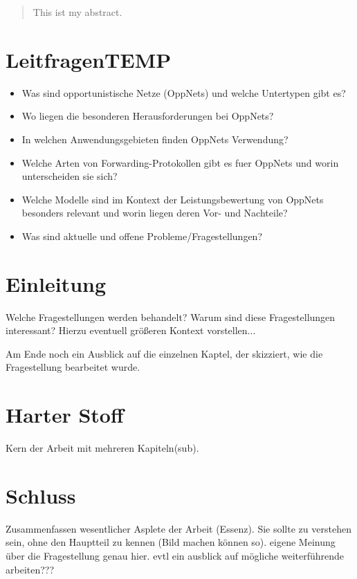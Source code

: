 \documentclass[a4paper, 12pt]{article}
\begin{document}

\tableofcontents

\begin{abstract}
	This ist my abstract.
\end{abstract}

\section{LeitfragenTEMP}
\begin{itemize}
\item Was sind opportunistische Netze (OppNets) und welche Untertypen gibt es?
\item Wo liegen die besonderen Herausforderungen bei OppNets?
\item In welchen Anwendungsgebieten finden OppNets Verwendung?
\item Welche Arten von Forwarding-Protokollen gibt es fuer OppNets und worin unterscheiden sie sich?
\item Welche Modelle sind im Kontext der Leistungsbewertung von OppNets besonders relevant und worin liegen deren Vor- und Nachteile?
\item Was sind aktuelle und offene Probleme/Fragestellungen?
\end{itemize}

\section{Einleitung}
Welche Fragestellungen werden behandelt?
Warum sind diese Fragestellungen interessant? Hierzu eventuell größeren Kontext vorstellen...

Am Ende noch ein Ausblick auf die einzelnen Kaptel, der skizziert, wie die Fragestellung bearbeitet wurde.


\section{Harter Stoff}
Kern der Arbeit mit mehreren Kapiteln(sub). 



\section{Schluss}
Zusammenfassen wesentlicher Asplete der Arbeit (Essenz).
Sie sollte zu verstehen sein, ohne den Hauptteil zu kennen (Bild machen können so).
eigene Meinung über die Fragestellung genau hier.
evtl ein ausblick auf mögliche weiterführende arbeiten???
\end{document}
